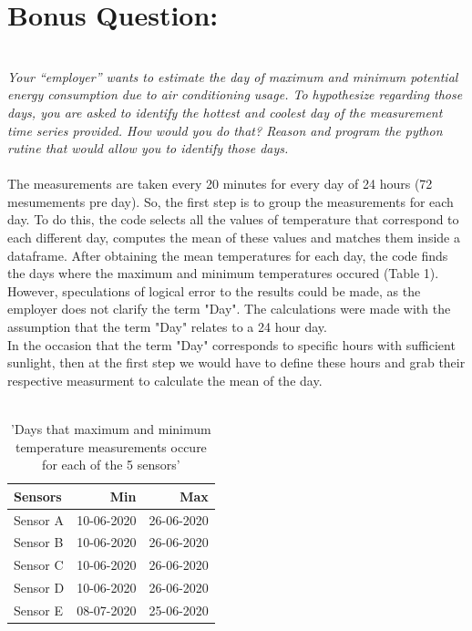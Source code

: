 \documentclass[a4paper,12pt]{article} %
\begin{document}
\section{\bf Bonus Question:}
\\
{\it Your “employer” wants to estimate the day of maximum and minimum potential energy 
consumption due to air conditioning usage. To hypothesize regarding those days, 
you are asked to identify the hottest and coolest day of the measurement time series provided. 
How would you do that? Reason and program the python rutine that would allow you to identify those days.}
\\\\
The measurements are taken every 20 minutes for every day of 24 hours (72 mesumements pre day). 
So, the first step is to group the measurements for each day. To do this, the code selects all the values
of temperature that correspond to each different day, computes the mean of these values and matches them
inside a dataframe. After obtaining the mean temperatures for each day, the code finds the days where the maximum and minimum 
temperatures occured (Table 1).\\
However, speculations of logical error to the results could be made, as the employer
does not clarify the term "Day". The calculations were made with the assumption that
the term "Day" relates to a 24 hour day.\\
In the occasion that the term "Day" corresponds to specific hours with sufficient sunlight, then at the first step we would have to
define these hours and grab their respective measurment to calculate the mean of the day. 
\\\\
\begin{table}[H]
\begin{center}
\begin{tabular}[\textwidth]{|l|r|r|} \hline 
\centering
    Sensors     & Min           & Max           \\\hline
    Sensor A    & 10-06-2020    & 26-06-2020    \\\hline
    Sensor B    & 10-06-2020    & 26-06-2020    \\\hline
    Sensor C    & 10-06-2020    & 26-06-2020    \\\hline
    Sensor D    & 10-06-2020    & 26-06-2020    \\\hline
    Sensor E    & 08-07-2020    & 25-06-2020    \\\hline
\end{tabular}
\caption{'Days that maximum and minimum temperature measurements occure for each of the 5 sensors'}
\end{center}
\end{table}
\end{document}

